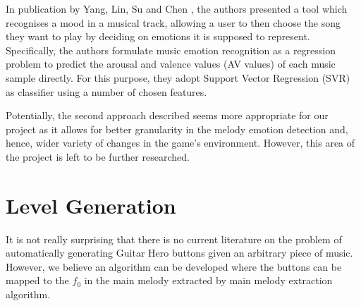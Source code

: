 In publication by Yang, Lin, Su and Chen \cite{mood}, the authors presented a tool which recognises a mood in a musical track, allowing a user to then choose the song they want to play by deciding on emotions it is supposed to represent.
Specifically, the authors formulate music emotion recognition as a regression problem to predict the arousal and valence values (AV values) of each music sample directly. For this purpose, they adopt Support Vector Regression (SVR) as classifier using a number of chosen features.


Potentially, the second approach described seems more appropriate for our project as it allows for better granularity in the melody emotion detection and, hence, wider variety of changes in the game's environment. However, this area of the project is left to be further researched.


\vspace{20pt}


\section{Level Generation}
It is not really surprising that there is no current literature on the problem of automatically generating Guitar Hero buttons given an arbitrary piece of music.
However, we believe an algorithm can be developed where the buttons can be mapped to the $f_{0}$ in the main melody extracted by main melody extraction algorithm.